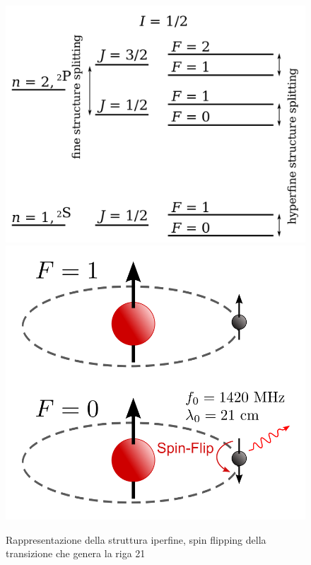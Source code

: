 \begin{figure}[h]
\includegraphics[scale=0.18]{Iperfine.pdf}
\hfill
\includegraphics[scale=0.18]{Flipping.pdf}
\centering
\caption{Rappresentazione della struttura iperfine, spin flipping della transizione che genera la riga 21}
\label{fig:Iperfine}
\end{figure}

